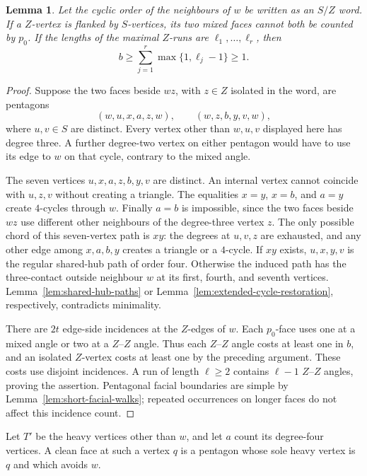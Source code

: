 \documentclass[11pt]{article}
\newtheorem{lemma}[theorem]{Lemma}
\theoremstyle{remark}
\numberwithin{equation}{section}
\numberwithin{table}{section}
\begin{document}
\begin{lemma}\label{lem:degree-two-z-runs}
Let the cyclic order of the neighbours of $w$ be written as an
$S/Z$ word. If a $Z$-vertex is flanked by $S$-vertices, its two mixed
faces cannot both be counted by $p_0$. If the lengths of the maximal
$Z$-runs are $\ell_1,\ldots,\ell_r$, then
\begin{equation}\label{eq:degree-two-z-run-cost}
 b\ge\sum_{j=1}^r\max\{1,\ell_j-1\}\ge1.
\end{equation}
\end{lemma}
\begin{proof}
Suppose the two faces beside $wz$, with $z\in Z$ isolated in the word,
are pentagons
\[
 (w,u,x,a,z,w),\qquad (w,z,b,y,v,w),
\]
where $u,v\in S$ are distinct. Every vertex other than $w,u,v$
displayed here has degree three. A further degree-two vertex on either
pentagon would have to use its edge to $w$ on that cycle, contrary to
the mixed angle.

The seven vertices $u,x,a,z,b,y,v$ are distinct. An internal vertex
cannot coincide with $u,z,v$ without creating a triangle. The
equalities $x=y$, $x=b$, and $a=y$ create $4$-cycles through $w$.
Finally $a=b$ is impossible, since the two faces beside $wz$ use
different other neighbours of the degree-three vertex $z$. The only
possible chord of this seven-vertex path is $xy$: the degrees at
$u,v,z$ are exhausted, and any other edge among $x,a,b,y$ creates a
triangle or a $4$-cycle. If $xy$ exists, $u,x,y,v$ is the regular
shared-hub path of order four. Otherwise the induced path has the
three-contact outside neighbour $w$ at its first, fourth, and seventh
vertices. Lemma~\ref{lem:shared-hub-paths} or
Lemma~\ref{lem:extended-cycle-restoration}, respectively, contradicts
minimality.

There are $2t$ edge-side incidences at the $Z$-edges of $w$. Each
$p_0$-face uses one at a mixed angle or two at a $Z$--$Z$ angle. Thus
each $Z$--$Z$ angle costs at least one in $b$, and an isolated
$Z$-vertex costs at least one by the preceding argument. These costs
use disjoint incidences. A run of length $\ell\ge2$ contains
$\ell-1$ $Z$--$Z$ angles, proving the assertion. Pentagonal facial
boundaries are simple by Lemma~\ref{lem:short-facial-walks}; repeated
occurrences on longer faces do not affect this incidence count.
\end{proof}

Let $T'$ be the heavy vertices other than $w$, and let $a$ count its
degree-four vertices. A clean face at such a vertex $q$ is a pentagon
whose sole heavy vertex is $q$ and which avoids $w$.
\end{document}
